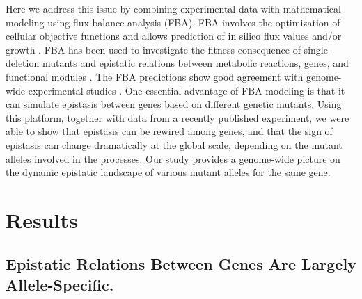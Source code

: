 Here we address this issue by combining experimental data with
mathematical modeling using flux balance analysis (FBA). FBA involves
the optimization of cellular objective functions and allows prediction
of in silico flux values and/or growth \citep{Mo2009, Becker2007,
Smallbone2009a}. FBA has been used to investigate the fitness
consequence of single-deletion mutants \citep{Papp2004, Ibarra2002}
and epistatic relations between metabolic reactions, genes, and
functional modules \citep{Harrison2007, Deutscher2006, Segre2005,
He2010}. The FBA predictions show good agreement with genome-wide
experimental studies \citep{Edwards2001, Segre2002_sb2013, Shlomi2005,
AbuOun2009, Durot2009, Feist2008, Fong2005a, Fong2005}.  One essential
advantage
of FBA modeling is that it can simulate epistasis between genes based
on different genetic mutants. Using this platform, together with data
from a recently published experiment, we were able to show that
epistasis can be rewired among genes, and that the sign of epistasis
can change dramatically at the global scale, depending on the mutant
alleles involved in the processes. Our study provides a genome-wide
picture on the dynamic epistatic landscape of various mutant alleles
for the same gene.

\section{Results}

\subsection{Epistatic Relations Between Genes Are Largely
Allele-Specific.}

